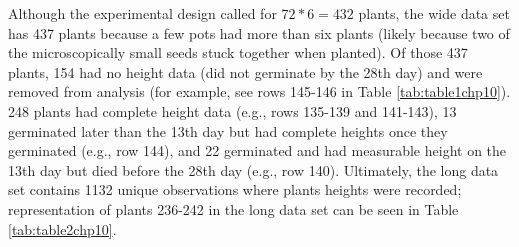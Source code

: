 \documentclass[
]{krantz}
\begin{document}
\begin{table}

\caption{\label{tab:table1chp10}A snapshot of data (Plants 231-246) from the Seed Germination case study in wide format.}
\centering
{}
\end{table}

Although the experimental design called for \(72*6=432\) plants, the wide data set has 437 plants because a few pots had more than six plants (likely because two of the microscopically small seeds stuck together when planted). Of those 437 plants, 154 had no height data (did not germinate by the 28th day) and were removed from analysis (for example, see rows 145-146 in Table \ref{tab:table1chp10}). 248 plants had complete height data (e.g., rows 135-139 and 141-143), 13 germinated later than the 13th day but had complete heights once they germinated (e.g., row 144), and 22 germinated and had measurable height on the 13th day but died before the 28th day (e.g., row 140). Ultimately, the long data set contains 1132 unique observations where plants heights were recorded; representation of plants 236-242 in the long data set can be seen in Table \ref{tab:table2chp10}.
\end{document}
